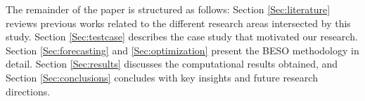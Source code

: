 \documentclass[preprint,11pt,authoryear]{elsarticle}
\begin{document}
The remainder of the paper is structured as follows: Section \ref{Sec:literature} reviews previous works related to the different research areas intersected by this study. Section \ref{Sec:testcase} describes the case study that motivated our research. Section \ref{Sec:forecasting} and \ref{Sec:optimization} present the BESO methodology in detail.  Section \ref{Sec:results} discusses the computational results obtained, and Section \ref{Sec:conclusions} concludes with key insights and future research directions.




\end{document}
